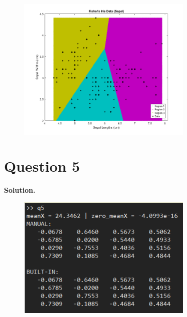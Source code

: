 \documentclass[11pt]{article}
\begin{document}
\begin{figure}[!h]
  \centering
  \includegraphics[width=0.75\textwidth]{../q4/sepal_fisheriris_clustered.png}
  \label{fig:sepalclust}
\end{figure}





\clearpage
\section*{Question 5}

\textbf{Solution.}




\begin{figure}[!h]
  \centering
  \includegraphics[width=0.75\textwidth]{../q5/q5_log.png}
  \label{fig:q5log}
\end{figure}
\end{document}
